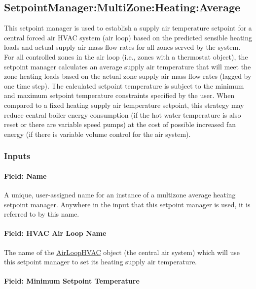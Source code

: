 \subsection{SetpointManager:MultiZone:Heating:Average}\label{setpointmanagermultizoneheatingaverage}

This setpoint manager is used to establish a supply air temperature setpoint for a central forced air HVAC system (air loop) based on the predicted sensible heating loads and actual supply air mass flow rates for all zones served by the system. For all controlled zones in the air loop (i.e., zones with a thermostat object), the setpoint manager calculates an average supply air temperature that will meet the zone heating loads based on the actual zone supply air mass flow rates (lagged by one time step). The calculated setpoint temperature is subject to the minimum and maximum setpoint temperature constraints specified by the user. When compared to a fixed heating supply air temperature setpoint, this strategy may reduce central boiler energy consumption (if the hot water temperature is also reset or there are variable speed pumps) at the cost of possible increased fan energy (if there is variable volume control for the air system).

\subsubsection{Inputs}\label{inputs-15-013}

\paragraph{Field: Name}\label{field-name-15-008}

A unique, user-assigned name for an instance of a multizone average heating setpoint manager. Anywhere in the input that this setpoint manager is used, it is referred to by this name.

\paragraph{Field: HVAC Air Loop Name}\label{field-hvac-air-loop-name-5}

The name of the \hyperref[airloophvac]{AirLoopHVAC} object (the central air system) which will use this setpoint manager to set its heating supply air temperature.

\paragraph{Field: Minimum Setpoint Temperature}\label{field-minimum-setpoint-temperature-5}

